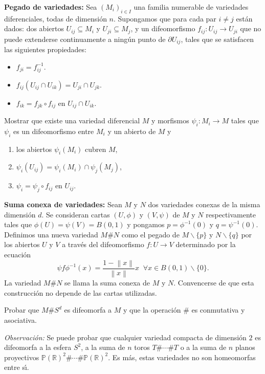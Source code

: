 \documentclass[11pt]{article}
\newcommand{\R}{{\mathbb{R}}}
\newcommand{\norm}[1]{\left\lVert#1\right\rVert}
\numberwithin{theorem}{subsection}
\begin{document}
\begin{question}
	\textbf{Pegado de variedades:} Sea $(M_i)_{i\in I}$ una familia numerable de variedades diferenciales, todas de dimensi\'on $n$. Supongamos que para cada par $i\neq j$ est\'an dados: dos abiertos $U_{ij}\subseteq M_i$ y $U_{ji}\subseteq M_j$, y un difeomorfismo $f_{ij}:U_{ij}\to U_{ji}$ que no puede extenderse continuamente a ning\'un punto de $\partial U_{ij}$, tales que se satisfacen las siguientes propiedades:
	\begin{itemize}
		\item $f_{ji}=f_{ij}^{-1}$.
		\item $f_{ij}(U_{ij}\cap U_{ik}) = U_{ji}\cap U_{jk}$.
		\item $f_{ik} = f_{jk}\circ f_{ij}$ en $U_{ij}\cap U_{ik}$.
	\end{itemize}
	
	Mostrar que existe una variedad diferencial $M$ y morfismos $\psi_i:M_i\to M$ tales que $\psi_i$ es un difeomorfismo entre $M_i$ y un abierto de $M$ y
	\begin{enumerate}
		\item los abiertos $\psi_i(M_i)$ cubren $M$,
		\item $\psi_i(U_{ij})=\psi_i(M_i)\cap\psi_j(M_j)$,
		\item $\psi_i=\psi_j\circ f_{ij}$ en $U_{ij}$.
	\end{enumerate}
\end{question}

\begin{question}
	\textbf{Suma conexa de variedades:} Sean $M$ y $N$ dos variedades conexas de la misma dimensi\'on $d$. Se consideran cartas $(U,\phi)$ y $(V,\psi)$ de $M$ y $N$ respectivamente tales que $\phi(U)=\psi(V)=B(0,1)$ y pongamos $p=\phi^{-1}(0)$ y $q=\psi^{-1}(0)$. Definimos una nueva variedad $M\# N$ como el pegado de $M\smallsetminus\{p\}$ y $N\smallsetminus\{q\}$ por los abiertos $U$ y $V$ a trav\'es del difeomorfismo $f:U\to V$ determinado por la ecuaci\'on $$\psi f\phi^{-1}(x)=\dfrac{1-\norm{x}}{\norm{x}} x \;\;\forall x\in B(0,1)\smallsetminus\{0\}.$$ La variedad $M\# N$ se llama la suma conexa de $M$ y $N$. Convencerse de que esta construcci\'on no depende de las cartas utilizadas.
	
	\noindent Probar que $M\# S^d$ es difeomorfa a $M$ y que la operaci\'on $\#$ es conmutativa y asociativa.
	\vspace{1em}
	
	\noindent \textit{Observaci\'on:} Se puede probar que cualquier variedad compacta de dimensi\'on $2$ es difeomorfa a la esfera $S^2$, a la suma de $n$ toros $T\#\cdots\# T$ o a la suma de $n$ planos proyectivos $\mathbb{P}(\R)^2\#\cdots\#\mathbb{P}(\R)^2$. Es m\'as, estas variedades no son homeomorfas entre s\'{\i}.
	
	
	
\end{question}
\end{document}
